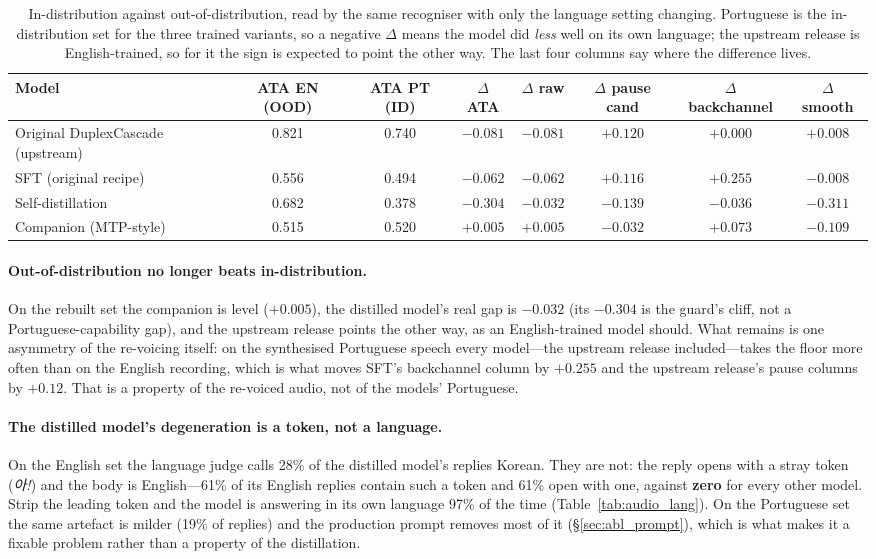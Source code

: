 \documentclass[conference]{IEEEtran}
\begin{document}
\begin{table}[t]
\centering
\caption{In-distribution against out-of-distribution, read by the same recogniser
with only the language setting changing. Portuguese is the in-distribution set
for the three trained variants, so a negative $\Delta$ means the model did
\emph{less} well on its own language; the upstream release is English-trained, so
for it the sign is expected to point the other way. The last four columns say
where the difference lives.}
\label{tab:audio_delta}
\footnotesize
\begin{tabular}{lccccccc}
\toprule
Model & ATA EN (OOD) & ATA PT (ID) & $\Delta$ ATA & $\Delta$ raw & $\Delta$ pause cand & $\Delta$ backchannel & $\Delta$ smooth \\
\midrule
Original DuplexCascade (upstream) & 0.821 & 0.740 & $-0.081$ & $-0.081$ & $+0.120$ & $+0.000$ & $+0.008$ \\
SFT (original recipe)             & 0.556 & 0.494 & $-0.062$ & $-0.062$ & $+0.116$ & $+0.255$ & $-0.008$ \\
Self-distillation                 & 0.682 & 0.378 & $-0.304$ & $-0.032$ & $-0.139$ & $-0.036$ & $-0.311$ \\
Companion (MTP-style)             & 0.515 & 0.520 & $+0.005$ & $+0.005$ & $-0.032$ & $+0.073$ & $-0.109$ \\
\bottomrule
\end{tabular}
\end{table}

\paragraph{Out-of-distribution no longer beats in-distribution.} On the rebuilt
set the companion is level ($+0.005$), the distilled model's real gap is $-0.032$
(its $-0.304$ is the guard's cliff, not a Portuguese-capability gap), and the
upstream release points the other way, as an English-trained model should. What
remains is one asymmetry of the re-voicing itself: on the synthesised Portuguese
speech every model---the upstream release included---takes the floor more often
than on the English recording, which is what moves SFT's backchannel column by
$+0.255$ and the upstream release's pause columns by $+0.12$. That is a property
of the re-voiced audio, not of the models' Portuguese.

\paragraph{The distilled model's degeneration is a token, not a language.} On the
English set the language judge calls 28\% of the distilled model's replies
Korean. They are not: the reply opens with a stray token (\emph{아!}) and the
body is English---61\% of its English replies contain such a token and 61\%
open with one, against \textbf{zero} for every other model. Strip the leading
token and the model is answering in its own language 97\% of the time
(Table~\ref{tab:audio_lang}). On the Portuguese set the same artefact is milder
(19\% of replies) and the production prompt removes most of it
(\S\ref{sec:abl_prompt}), which is what makes it a fixable problem rather than
a property of the distillation.
\end{document}
